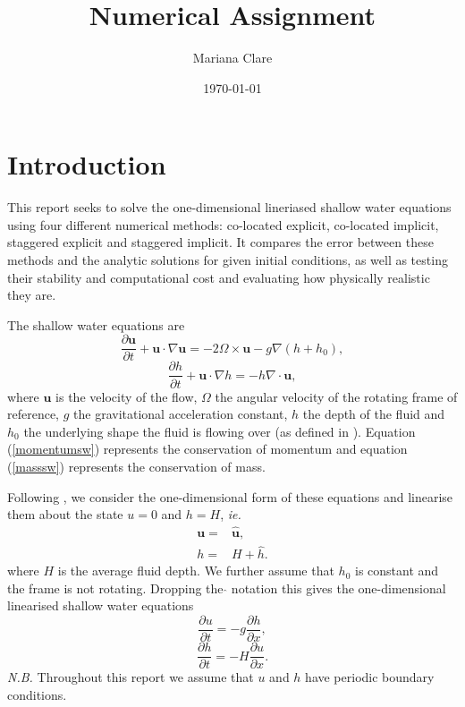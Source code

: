 \documentclass[a4paper, 10pt, notitlepage]{article}
\title{Numerical Assignment}
\author{Mariana Clare}
\date{\today}
\begin{document}
	
\maketitle
\thispagestyle{empty}
\section{Introduction}
This report seeks to solve the one-dimensional lineriased shallow water equations using four different numerical methods: co-located explicit, co-located implicit, staggered explicit and staggered implicit. It compares the error between these methods and the analytic solutions for given initial conditions, as well as testing their stability and computational cost and evaluating how physically realistic they are.

The shallow water equations are
\begin{equation}\label{momentumsw}
\frac{\partial \mathbf{u}}{\partial t} + \mathbf{u}\cdot\nabla\mathbf{u} = - 2\Omega \times\mathbf{u} - g\nabla (h + h_{0}),
\end{equation}
\begin{equation}\label{masssw}
\frac{\partial h}{\partial t} + \mathbf{u}\cdot\nabla h = - h \nabla \cdot \mathbf{u},
\end{equation}
where $\mathbf{u}$ is the velocity of the flow, $\Omega$ the angular velocity of the rotating frame of reference, $g$ the gravitational acceleration constant, $h$ the depth of the fluid and $h_{0}$ the underlying shape the fluid is flowing over (as defined in \cite{MPE textbook}). Equation (\ref{momentumsw}) represents the conservation of momentum and equation (\ref{masssw}) represents the conservation of mass.

Following \cite{MPE textbook}, we consider the one-dimensional form of these equations and linearise them about the state $u = 0$ and $h = H$, \textit{ie.}
\begin{eqnarray}
\mathbf{u} =  & \mathbf{\hat{u}},
 \\
h = &  H + \hat{h} .
\end{eqnarray}
where $H$ is the average fluid depth. We further assume that $h_{0}$ is constant and the frame is not rotating. Dropping the $\hat{}$ notation this gives the one-dimensional linearised shallow water equations
\begin{equation}\label{linearisedsw1}
\frac{\partial u}{\partial t} = - g \frac{\partial h}{\partial x},
\end{equation}
\begin{equation}\label{linearisedsw2}
\frac{\partial h}{\partial t} = - H \frac{\partial u}{\partial x}.
\end{equation}
\textit{N.B.} Throughout this report we assume that $u$ and $h$ have periodic boundary conditions.
\end{document}
